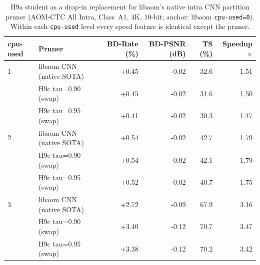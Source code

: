 \begin{table}[t]\centering
\caption{H9a student as a drop-in replacement for libaom's native intra CNN partition pruner (AOM-CTC All Intra, Class~A1, 4K, 10-bit; anchor: libaom \texttt{cpu-used=0}). Within each \texttt{cpu-used} level every speed feature is identical except the pruner.}
\label{tab:fase6-swap}
\begin{tabular}{llrrrr}
\toprule
cpu-used & Pruner & BD-Rate (\%) & BD-PSNR (dB) & TS (\%) & Speedup$\times$ \\
\midrule
1 & libaom CNN (native SOTA) & +0.45 & -0.02 & 32.6 & 1.51 \\
 & H9c tau=0.90 (swap) & +0.45 & -0.02 & 31.6 & 1.50 \\
 & H9c tau=0.95 (swap) & +0.41 & -0.02 & 30.3 & 1.47 \\
\midrule
2 & libaom CNN (native SOTA) & +0.54 & -0.02 & 42.7 & 1.79 \\
 & H9c tau=0.90 (swap) & +0.54 & -0.02 & 42.1 & 1.79 \\
 & H9c tau=0.95 (swap) & +0.52 & -0.02 & 40.7 & 1.75 \\
\midrule
3 & libaom CNN (native SOTA) & +2.72 & -0.09 & 67.9 & 3.16 \\
 & H9c tau=0.90 (swap) & +3.40 & -0.12 & 70.7 & 3.47 \\
 & H9c tau=0.95 (swap) & +3.38 & -0.12 & 70.2 & 3.42 \\
\midrule
\bottomrule
\end{tabular}\end{table}
